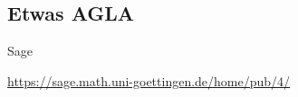 \documentclass[notes=hide,hyperref={dvipdfmx,pdfpagelabels=false}]{beamer}
\begin{document}
\subsection{Etwas AGLA}
\begin{frame}[fragile]{Sage}
\begin{center}
\url{https://sage.math.uni-goettingen.de/home/pub/4/}
\end{center}
\end{frame}
%
%
%
%
%
\end{document}
